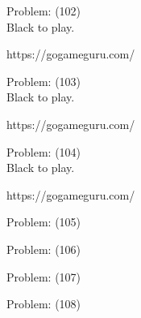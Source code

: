 \documentclass[11pt]{article}
\begin{document}
\begin{minipage}[t]{0.5\textwidth}
  {\centering
  
  Problem: (102)\\
  Black to play.

https://gogameguru.com/\\
  }
\end{minipage}
\begin{minipage}[t]{0.5\textwidth}
  {\centering
  
  Problem: (103)\\
  Black to play.

https://gogameguru.com/\\
  }
\end{minipage}
\begin{minipage}[t]{0.5\textwidth}
  {\centering
  
  Problem: (104)\\
  Black to play.

https://gogameguru.com/\\
  }
\end{minipage}
\begin{minipage}[t]{0.5\textwidth}
  {\centering
  
  Problem: (105)\\
  
  }
\end{minipage}
\begin{minipage}[t]{0.5\textwidth}
  {\centering
  
  Problem: (106)\\
  
  }
\end{minipage}
\begin{minipage}[t]{0.5\textwidth}
  {\centering
  
  Problem: (107)\\
  
  }
\end{minipage}
\begin{minipage}[t]{0.5\textwidth}
  {\centering
  
  Problem: (108)\\
  
  }
\end{minipage}
\end{document}
